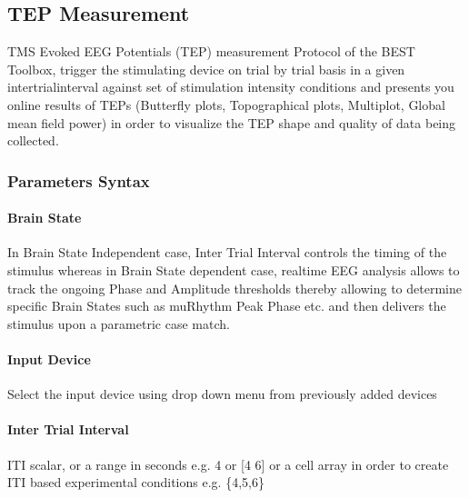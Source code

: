 \documentclass[letterpaper,10pt,english]{sphinxmanual}
\begin{document}
\begin{figure}[htbp]
\centering

\noindent{}
\end{figure}


\subsection{TEP Measurement}
\label{\detokenize{11_TEPMeasurement:tep-measurement}}\label{\detokenize{11_TEPMeasurement::doc}}
\sphinxAtStartPar
TMS Evoked EEG Potentials (TEP) measurement Protocol of the BEST Toolbox, trigger the stimulating device on trial by trial basis in a given inter\sphinxhyphen{}trial\sphinxhyphen{}interval against set of stimulation intensity conditions and presents you online results of TEPs (Butterfly plots, Topographical plots, Multiplot, Global mean field power) in order to visualize the TEP shape and quality of data being collected.


\subsubsection{Parameters Syntax}
\label{\detokenize{11_TEPMeasurement:parameters-syntax}}

\paragraph{Brain State}
\label{\detokenize{11_TEPMeasurement:brain-state}}
\sphinxAtStartPar
In Brain State Independent case, Inter Trial Interval controls the timing of the stimulus whereas in Brain State dependent case, real\sphinxhyphen{}time EEG analysis allows to track the ongoing Phase and Amplitude thresholds thereby allowing to determine specific Brain States such as mu\sphinxhyphen{}Rhythm Peak Phase etc. and then delivers the stimulus upon a parametric case match.


\paragraph{Input Device}
\label{\detokenize{11_TEPMeasurement:input-device}}
\sphinxAtStartPar
Select the input device using drop down menu from previously added devices


\paragraph{Inter Trial Interval}
\label{\detokenize{11_TEPMeasurement:inter-trial-interval}}
\sphinxAtStartPar
ITI scalar, or a range in seconds e.g. 4 or {[}4 6{]} or a cell array in order to create ITI based experimental conditions e.g. \{4,5,6\}
\end{document}
